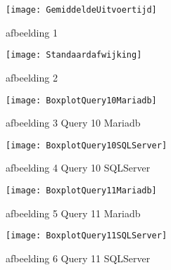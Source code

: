 \documentclass[fleqn,10pt]{artikeltin}
\begin{document}
\vspace{5mm} %

\begin{figure}
	\centering
	\texttt{[image: GemiddeldeUitvoertijd]}
	\caption{afbeelding 1}
\end{figure}

\vspace{5mm} %

\begin{figure}
	\centering
	\texttt{[image: Standaardafwijking]}
	\caption{afbeelding 2}
\end{figure}

\vspace{5mm} %

\begin{figure}
	\centering
	\texttt{[image: BoxplotQuery10Mariadb]}
	\caption{afbeelding 3 Query 10 Mariadb}
\end{figure}

\vspace{5mm} %

\begin{figure}
\centering
\texttt{[image: BoxplotQuery10SQLServer]}
\caption{afbeelding 4 Query 10 SQLServer}
\end{figure}

\vspace{5mm} %

\begin{figure}
	\centering
	\texttt{[image: BoxplotQuery11Mariadb]}
	\caption{afbeelding 5 Query 11 Mariadb}
\end{figure}

\vspace{5mm} %

\begin{figure}
	\centering
	\texttt{[image: BoxplotQuery11SQLServer]}
	\caption{afbeelding 6 Query 11 SQLServer}
\end{figure}

\vspace{5mm} %
\printbibliography[heading=bibintoc]
\end{document}
